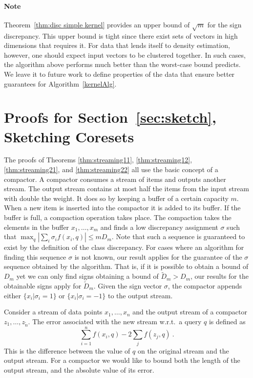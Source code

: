 \documentclass[12pt]{colt2019} %
\begin{document}
{\paragraph{Note} Theorem~\ref{thm:disc simple kernel} provides an upper bound of $\sqrt{m}$ for the sign discrepancy. 
This upper bound is tight since there exist sets of vectors in high dimensions that requires it. 
For data that lends itself to density estimation, however, one should expect input vectors to be clustered together.
In such cases, the algorithm above performs much better than the worst-case bound predicts. 
We leave it to future work to define properties of the data that ensure better guarantees for Algorithm~\ref{kernelAlg}.


\appendix

\section{Proofs for Section~\ref{sec:sketch}, Sketching Coresets} \label{app:sketch proof}


The proofs of Theorems \ref{thm:streaming11}, \ref{thm:streaming12}, \ref{thm:streaming21}, and \ref{thm:streaming22} all use the basic concept of a compactor. A compactor consumes a stream of items and outputs another stream. 
The output stream contains at most half the items from the input stream with double the weight. 
It does so by keeping a buffer of a certain capacity $m$. When a new item is inserted into the compactor it is added to its buffer. 
If the buffer is full, a compaction operation takes place. 
The compaction takes the elements in the buffer $x_1,\ldots,x_m$ and finds a low discrepancy assignment $\sigma$ such that 
$\max_q |\sum_i \sigma_i f(x_i,q)| \leq m D_m$. 
Note that such a sequence is guaranteed to exist by the definition of the class discrepancy. For cases where an algorithm for finding this sequence $\sigma$ is not known, our result applies for the guarantee of the $\sigma$ sequence obtained by the algorithm. 
That is, if it is possible to obtain a bound of $D_m$ yet we can only find signs obtaining a bound of $\tilde{D}_m > D_m$, our results for the obtainable signs apply for $\tilde{D}_m$.
Given the sign vector $\sigma$, the compactor appends either $\{ x_i | \sigma_i = 1\}$ or  $\{ x_i | \sigma_i = -1\}$ to the output stream. 

Consider a stream of data points $x_1,\ldots,x_n$ and the output stream of a compactor $z_1,\ldots,z_{\tilde{n}}$. The error associated with the new stream w.r.t.\ a query $q$ is defined as
$$ \sum_{i=1}^n f(x_i,q) - 2\sum_j f(z_j,q) \ .$$
This is the difference between the value of $q$ on the original stream and the output stream. For a compactor we would like to bound both the length of the output stream, and the absolute value of its error.

}
\end{document}
